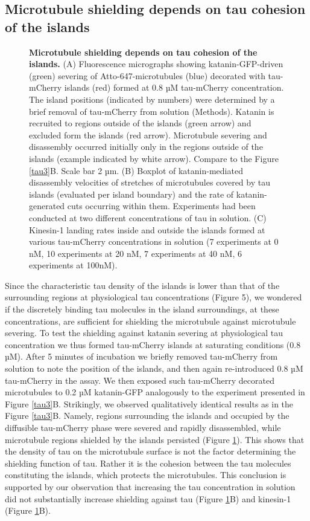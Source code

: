 \subsection{Microtubule shielding depends on tau cohesion of the islands}
\begin{figure}[h!tb]
\centering
\caption[Microtubule shielding depends on tau cohesion of the islands.]{ 
\textbf{Microtubule shielding depends on tau cohesion of the islands.} (A) Fluorescence micrographs showing katanin-GFP-driven (green) severing of Atto-647-microtubules (blue) decorated with tau-mCherry islands (red) formed at 0.8 µM tau-mCherry concentration. The island positions (indicated by numbers) were determined by a brief removal of tau-mCherry from solution (Methods). Katanin is recruited to regions outside of the islands (green arrow) and excluded form the islands (red arrow). Microtubule severing and disassembly occurred initially only in the regions outside of the islands (example indicated by white arrow). Compare to the Figure \ref{tau3}B. Scale bar 2 µm. (B) Boxplot of katanin-mediated disassembly velocities of stretches of microtubules covered by tau islands (evaluated per island boundary) and the rate of katanin-generated cuts occurring within them. Experiments had been conducted at two different concentrations of tau in solution. (C) Kinesin-1 landing rates inside and outside the islands formed at various tau-mCherry concentrations in solution (7 experiments at 0 nM, 10 experiments at 20 nM, 7 experiments at 40 nM, 6 experiments at 100nM).
	}\label{tau6}
\end{figure}
 Since the characteristic tau density of the islands is lower than that of the surrounding regions at physiological tau concentrations (Figure 5), we wondered if the discretely binding tau molecules in the island surroundings, at these concentrations, are sufficient for shielding the microtubule against microtubule severing. To test the shielding against katanin severing at physiological tau concentration we thus formed tau-mCherry islands at saturating conditions (0.8 µM). After 5 minutes of incubation we briefly removed tau-mCherry from solution to note the position of the islands, and then again re-introduced 0.8 µM tau-mCherry in the assay. We then exposed such tau-mCherry decorated microtubules to 0.2 µM katanin-GFP analogously to the experiment presented in Figure \ref{tau3}B. Strikingly, we observed qualitatively identical results as in the Figure \ref{tau3}B. Namely, regions surrounding the islands and occupied by the diffusible tau-mCherry phase were severed and rapidly disassembled, while microtubule regions shielded by the islands persisted (Figure \ref{tau6}). This shows that the density of tau on the microtubule surface is not the factor determining the shielding function of tau. Rather it is the cohesion between the tau molecules constituting the islands, which protects the microtubules. This conclusion is supported by our observation that increasing the tau concentration in solution did not substantially increase shielding against tau (Figure \ref{tau6}B) and kinesin-1 (Figure \ref{tau6}B). 

